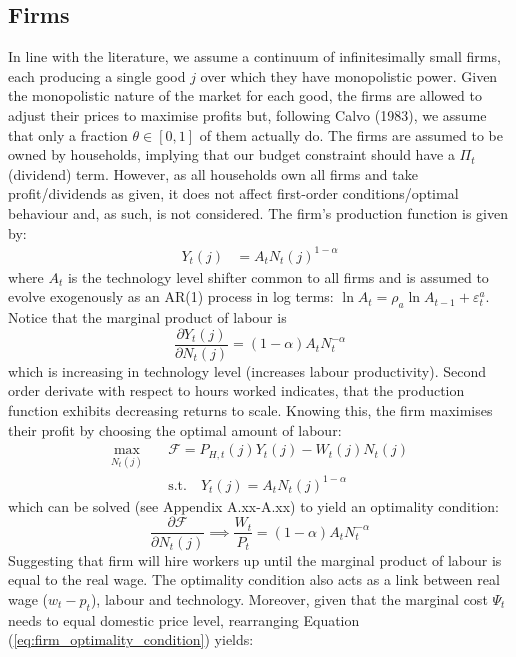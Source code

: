 \subsection{Firms}
In line with the literature, we assume a continuum of infinitesimally small firms, each producing a single good $j$ over which they have monopolistic power. Given the monopolistic nature of the market for each good, the firms are allowed to adjust their prices to maximise profits but, following Calvo (1983), we assume that only a fraction $\theta \in [0,1]$ of them actually do. The firms are assumed to be owned by households, implying that our budget constraint should have a $\Pi_t$ (dividend) term. However, as all households own all firms and take profit/dividends as given, it does not affect first-order conditions/optimal behaviour and, as such, is not considered. The firm's production function is given by: 
\begin{align}
    Y_t(j)   & = A_t {N_t(j)}^{1-\alpha}                         
\end{align}
where $A_t$ is the technology level shifter common to all firms and is assumed to evolve exogenously as an AR(1) process in log terms: $\ln A_t = \rho_a \ln A_{t-1} + \varepsilon^a_t$. Notice that the marginal product of labour is
\begin{equation}
    \frac{\partial Y_t(j)}{\partial N_t(j)} = (1-\alpha)A_t N_t^{-\alpha}
\end{equation}
which is increasing in technology level (increases labour productivity). Second order derivate with respect to hours worked indicates, that the production function exhibits decreasing returns to scale. Knowing this, the firm maximises their profit by choosing the optimal amount of labour:
\begin{align}
    \max_{N_t(j)}             \quad & \mathcal{F} = P_{H,t}(j)Y_{t}(j) - W_t(j)N_{t}(j) \\
     & \text{s.t.} \quad  Y_t(j)    = A_t {N_t(j)}^{1-\alpha}     
\end{align}
which can be solved (see Appendix A.xx-A.xx) to yield an optimality condition:
\begin{equation}
    \frac{\partial \mathcal{F}}{\partial N_t(j)} \implies \frac{W_t}{P_t} = (1-\alpha)A_t N_t^{-\alpha} \label{eq:firm_optimality_condition}
\end{equation}
Suggesting that firm will hire workers up until the marginal product of labour is equal to the real wage. The optimality condition also acts as a link between real wage ($w_t - p_t$), labour and technology. Moreover, given that the marginal cost $\Psi_t$ needs to equal domestic price level, rearranging Equation (\ref{eq:firm_optimality_condition}) yields: 

